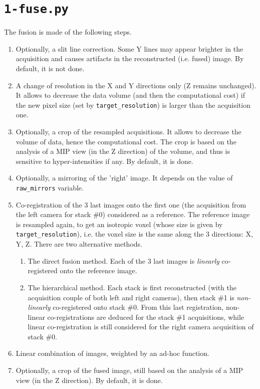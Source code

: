 \section{\texttt{1-fuse.py}}
\label{sec:cli:fuse}

The fusion is made of the following steps.
\begin{enumerate}
\itemsep -1ex
\item \label{it:fusion:slit:line} Optionally, a slit line correction. Some Y lines may appear brighter in the acquisition and causes artifacts in the reconstructed (i.e. fused) image. By default, it is not done.

\item A change of resolution in the X and Y directions only (Z remains unchanged). It allows to decrease the data volume (and then the computational cost) if the new pixel size (set by \verb|target_resolution|) is larger than the acquisition one.

\item \label{it:fusion:crop:1} Optionally, a crop of the resampled acquisitions. It allows to decrease the volume of data, hence the computational cost. The crop is based on the analysis of a MIP view (in the Z direction) of  the volume, and thus is sensitive to hyper-intensities if any. By default, it is done.

\item Optionally, a mirroring of the 'right' image. It depends on the value of  \verb|raw_mirrors| variable.

\item \label{it:fusion:registration} Co-registration of the 3 last images onto the first one (the acquisition from the left camera for stack \#0) considered as a reference. The reference image is resampled again, to get an isotropic voxel (whose size is given by \verb|target_resolution|), i.e. the voxel size is the same along the 3 directions: X, Y, Z. There are two alternative methods.
\begin{enumerate}
\itemsep -1ex
\item The direct fusion method. Each of the  3 last images is \textit{linearly} co-registered onto the reference image.
\item The hierarchical method. Each stack is first reconstructed (with the acquisition couple of both left and right cameras), then stack \#1 is \textit{non-linearly} co-registered onto stack \#0. From this last registration, non-linear co-registrations are deduced for the stack \#1 acquisitions, while linear co-registration is still considered for the right camera acquisition of stack \#0.
\end{enumerate}

\item \label{it:fusion:combination}  Linear combination of images, weighted by an ad-hoc function.

\item  \label{it:fusion:crop:2} Optionally, a crop of the fused image, still based on the analysis of a MIP view (in the Z direction). By default, it is done.
\end{enumerate}




